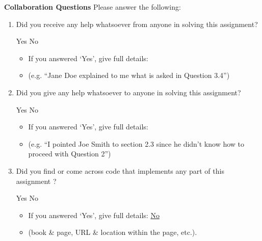 \documentclass[11pt,addpoints,answers]{exam}
\numberwithin{equation}{section} %
\numberwithin{figure}{section} %
\numberwithin{table}{section} %
\begin{document}
\clearpage

\textbf{Collaboration Questions} Please answer the following:

\begin{enumerate}
    \item Did you receive any help whatsoever from anyone in solving this assignment?
    \begin{checkboxes}
     \choice Yes
     \choice No
    \end{checkboxes}
    \begin{itemize}
        \item If you answered `Yes', give full details:
        \item (e.g. “Jane Doe explained to me what is asked in Question 3.4”)
    \end{itemize}

    \begin{tcolorbox}[fit,height=3cm,blank, borderline={1pt}{-2pt},nobeforeafter]
    \end{tcolorbox}

    \item Did you give any help whatsoever to anyone in solving this assignment?
    \begin{checkboxes}
     \choice Yes
     \choice No
    \end{checkboxes}
    \begin{itemize}
        \item If you answered `Yes', give full details:
        \item (e.g. “I pointed Joe Smith to section 2.3 since he didn’t know how to proceed with Question 2”)
    \end{itemize}

    \begin{tcolorbox}[fit,height=3cm,blank, borderline={1pt}{-2pt},nobeforeafter]
    \end{tcolorbox}

    \item Did you find or come across code that implements any part of this assignment ? 
    \begin{checkboxes}
     \choice Yes
     \choice No
    \end{checkboxes}
    \begin{itemize}
        \item If you answered `Yes', give full details: \underline{No}
        \item (book \& page, URL \& location within the page, etc.).
    \end{itemize}
    \begin{tcolorbox}[fit,height=3cm,blank, borderline={1pt}{-2pt},nobeforeafter]
    \end{tcolorbox}
\end{enumerate}
\end{document}
